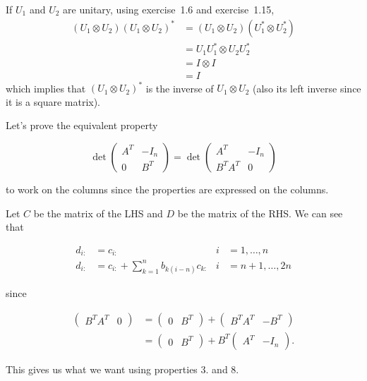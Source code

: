 \begin{solution}
  If $U_1$ and $U_2$ are unitary,
  using exercise~1.6 and exercise~1.15,
  \begin{align*}
    (U_1 \otimes U_2) (U_1 \otimes U_2)^*
    & = (U_1 \otimes U_2) (U_1^* \otimes U_2^*)\\
    & = U_1U_1^* \otimes U_2U_2^*\\
    & = I \otimes I\\
    & = I
  \end{align*}
  which implies that $(U_1 \otimes U_2)^*$
  is the inverse of $U_1 \otimes U_2$
  (also its left inverse since it is a square matrix).
\end{solution}


\begin{solution}

  Let's prove the equivalent property

  \[
    \det\begin{pmatrix}
      A^T & -I_n\\
      0 & B^T
    \end{pmatrix} =
    \det\begin{pmatrix}
      A^T & -I_n\\
      B^TA^T & 0
    \end{pmatrix}
  \]

  to work on the columns since the properties are expressed
  on the columns.

  Let $C$ be the matrix of the LHS and
  $D$ be the matrix of the RHS.
  We can see that

  \begin{align*}
    d_{i:} &= c_{i:} & i & = 1, \ldots, n\\
    d_{i:} &= c_{i:} + \sum_{k=1}^n b_{k(i-n)} c_{k:} & i & = n+1, \ldots, 2n
  \end{align*}

  since

  \begin{align*}
    \begin{pmatrix}
      B^TA^T & 0
    \end{pmatrix}
    & =
    \begin{pmatrix}
      0 & B^T
    \end{pmatrix}
    +
    \begin{pmatrix}
      B^TA^T & -B^T
    \end{pmatrix}\\
    & =
    \begin{pmatrix}
      0 & B^T
    \end{pmatrix}
    +
    B^T
    \begin{pmatrix}
      A^T & -I_n
    \end{pmatrix}.
  \end{align*}

  This gives us what we want using properties 3. and 8.

\end{solution}

